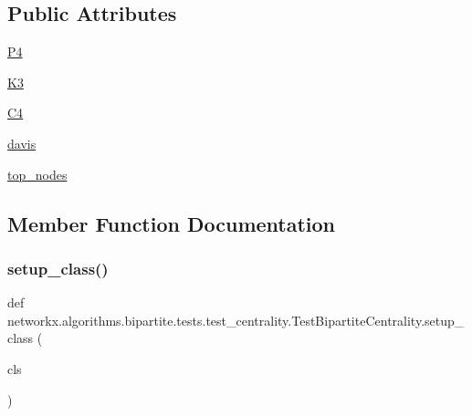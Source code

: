 \subsection*{Public Attributes}
\begin{DoxyCompactItemize}
\item 
\hyperlink{classnetworkx_1_1algorithms_1_1bipartite_1_1tests_1_1test__centrality_1_1TestBipartiteCentrality_a7ac4f199cdf4056fb2e8a6dea498e7fc}{P4}
\item 
\hyperlink{classnetworkx_1_1algorithms_1_1bipartite_1_1tests_1_1test__centrality_1_1TestBipartiteCentrality_a681bc70e4ffd8d15b2a5e79bef19d9e6}{K3}
\item 
\hyperlink{classnetworkx_1_1algorithms_1_1bipartite_1_1tests_1_1test__centrality_1_1TestBipartiteCentrality_adf2c82d939eebc484533316435562ed1}{C4}
\item 
\hyperlink{classnetworkx_1_1algorithms_1_1bipartite_1_1tests_1_1test__centrality_1_1TestBipartiteCentrality_a0dbd3a73274eb0d768e544ca2c7b0c29}{davis}
\item 
\hyperlink{classnetworkx_1_1algorithms_1_1bipartite_1_1tests_1_1test__centrality_1_1TestBipartiteCentrality_ab0ce3f731bfef9bf1b42a36d9f04279c}{top\+\_\+nodes}
\end{DoxyCompactItemize}


\subsection{Member Function Documentation}
\mbox{\label{classnetworkx_1_1algorithms_1_1bipartite_1_1tests_1_1test__centrality_1_1TestBipartiteCentrality_a72d18268d1f9e6a2e2cf262b4efe2ccc}} 
\subsubsection{\texorpdfstring{setup\+\_\+class()}{setup\_class()}}
{\footnotesize\ttfamily def networkx.\+algorithms.\+bipartite.\+tests.\+test\+\_\+centrality.\+Test\+Bipartite\+Centrality.\+setup\+\_\+class (\begin{DoxyParamCaption}\item[{}]{cls }\end{DoxyParamCaption})}

